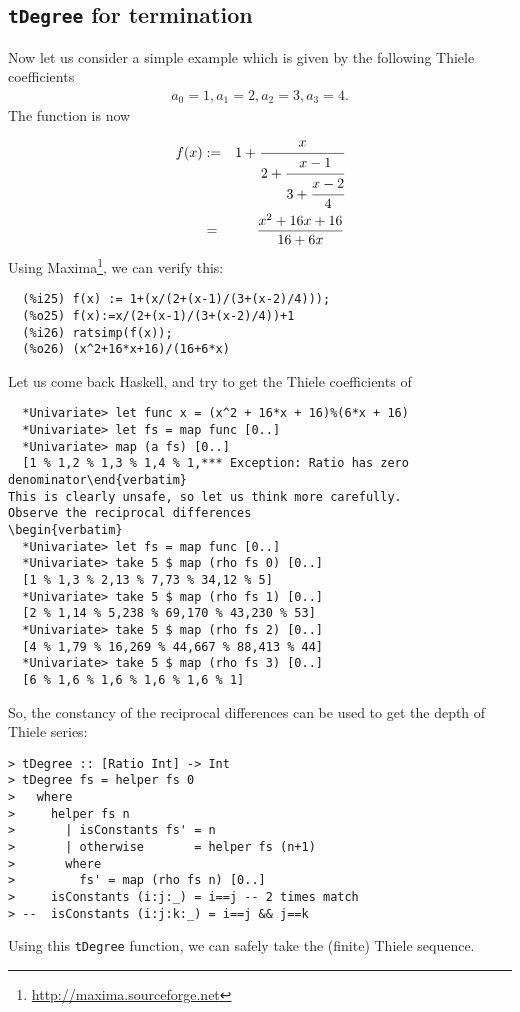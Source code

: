 \documentclass[11pt]{book}
\begin{document}
\subsection{\texttt{tDegree} for termination}
Now let us consider a simple example which is given by the following Thiele coefficients
\begin{eqnarray}
a_0 = 1, a_1 = 2, a_2 = 3, a_3=4.
\end{eqnarray}
The function is now
\begin{eqnarray}
f(x) &:=& 1 + \cfrac{x}{2+\cfrac{x-1}{3+\cfrac{x-2}{4}}} \\
&=& \frac{x^2+16x+16}{16+6x}
\end{eqnarray}
Using Maxima\footnote{
\url{http://maxima.sourceforge.net}
}, we can verify this:
\begin{verbatim}
  (%i25) f(x) := 1+(x/(2+(x-1)/(3+(x-2)/4)));
  (%o25) f(x):=x/(2+(x-1)/(3+(x-2)/4))+1
  (%i26) ratsimp(f(x));
  (%o26) (x^2+16*x+16)/(16+6*x)
\end{verbatim}
Let us come back Haskell, and try to get the Thiele coefficients of
\begin{verbatim}
  *Univariate> let func x = (x^2 + 16*x + 16)%(6*x + 16)
  *Univariate> let fs = map func [0..]
  *Univariate> map (a fs) [0..]
  [1 % 1,2 % 1,3 % 1,4 % 1,*** Exception: Ratio has zero denominator\end{verbatim}
This is clearly unsafe, so let us think more carefully.
Observe the reciprocal differences
\begin{verbatim}
  *Univariate> let fs = map func [0..]
  *Univariate> take 5 $ map (rho fs 0) [0..]
  [1 % 1,3 % 2,13 % 7,73 % 34,12 % 5]
  *Univariate> take 5 $ map (rho fs 1) [0..]
  [2 % 1,14 % 5,238 % 69,170 % 43,230 % 53]
  *Univariate> take 5 $ map (rho fs 2) [0..]
  [4 % 1,79 % 16,269 % 44,667 % 88,413 % 44]
  *Univariate> take 5 $ map (rho fs 3) [0..]
  [6 % 1,6 % 1,6 % 1,6 % 1,6 % 1]
\end{verbatim}
So, the constancy of the reciprocal differences can be used to get the depth of Thiele series:
\begin{verbatim}
> tDegree :: [Ratio Int] -> Int
> tDegree fs = helper fs 0
>   where
>     helper fs n
>       | isConstants fs' = n
>       | otherwise       = helper fs (n+1)
>       where
>         fs' = map (rho fs n) [0..]
>     isConstants (i:j:_) = i==j -- 2 times match
> --  isConstants (i:j:k:_) = i==j && j==k
\end{verbatim}
Using this \verb+tDegree+ function, we can safely take the (finite) Thiele sequence.
\end{document}
